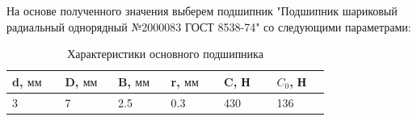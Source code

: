 \documentclass[14pt,a4paper,russian]{scrartcl}
\begin{document}
        На основе полученного значения выберем подшипник "Подшипник шариковый радиальный однорядный №2000083 ГОСТ 8538-74" со следующими
        параметрами:
        \begin{table}[h!]
            \begin{center}
                \begin{tabular}{p{0.13\linewidth}p{0.13\linewidth}p{0.13\linewidth}p{0.13\linewidth}p{0.13\linewidth}p{0.13\linewidth}}
                    \hline
                    d, \( \text{мм} \) & D, \( \text{мм} \) & B, \( \text{мм} \) & r, \( \text{мм} \) & C, Н & \( C_0 \), Н \\
                    \hline
                    3 & 7 & 2.5 & 0.3 & 430 & 136 \\
                    \hline
                \end{tabular}
                \caption{{Характеристики основного подшипника}}\label{tab:podsh}
            \end{center}
        \end{table}
        

        
        
        
        
        
        
        
        

        
        
        
        
        
        
        

    
\end{document}
